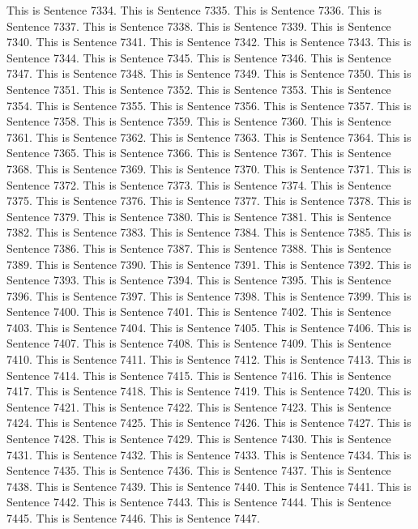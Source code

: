 \documentclass{article}
\begin{document}
This is Sentence 7334.
This is Sentence 7335.
This is Sentence 7336.
This is Sentence 7337.
This is Sentence 7338.
This is Sentence 7339.
This is Sentence 7340.
This is Sentence 7341.
This is Sentence 7342.
This is Sentence 7343.
This is Sentence 7344.
This is Sentence 7345.
This is Sentence 7346.
This is Sentence 7347.
This is Sentence 7348.
This is Sentence 7349.
This is Sentence 7350.
This is Sentence 7351.
This is Sentence 7352.
This is Sentence 7353.
This is Sentence 7354.
This is Sentence 7355.
This is Sentence 7356.
This is Sentence 7357.
This is Sentence 7358.
This is Sentence 7359.
This is Sentence 7360.
This is Sentence 7361.
This is Sentence 7362.
This is Sentence 7363.
This is Sentence 7364.
This is Sentence 7365.
This is Sentence 7366.
This is Sentence 7367.
This is Sentence 7368.
This is Sentence 7369.
This is Sentence 7370.
This is Sentence 7371.
This is Sentence 7372.
This is Sentence 7373.
This is Sentence 7374.
This is Sentence 7375.
This is Sentence 7376.
This is Sentence 7377.
This is Sentence 7378.
This is Sentence 7379.
This is Sentence 7380.
This is Sentence 7381.
This is Sentence 7382.
This is Sentence 7383.
This is Sentence 7384.
This is Sentence 7385.
This is Sentence 7386.
This is Sentence 7387.
This is Sentence 7388.
This is Sentence 7389.
This is Sentence 7390.
This is Sentence 7391.
This is Sentence 7392.
This is Sentence 7393.
This is Sentence 7394.
This is Sentence 7395.
This is Sentence 7396.
This is Sentence 7397.
This is Sentence 7398.
This is Sentence 7399.
This is Sentence 7400.
This is Sentence 7401.
This is Sentence 7402.
This is Sentence 7403.
This is Sentence 7404.
This is Sentence 7405.
This is Sentence 7406.
This is Sentence 7407.
This is Sentence 7408.
This is Sentence 7409.
This is Sentence 7410.
This is Sentence 7411.
This is Sentence 7412.
This is Sentence 7413.
This is Sentence 7414.
This is Sentence 7415.
This is Sentence 7416.
This is Sentence 7417.
This is Sentence 7418.
This is Sentence 7419.
This is Sentence 7420.
This is Sentence 7421.
This is Sentence 7422.
This is Sentence 7423.
This is Sentence 7424.
This is Sentence 7425.
This is Sentence 7426.
This is Sentence 7427.
This is Sentence 7428.
This is Sentence 7429.
This is Sentence 7430.
This is Sentence 7431.
This is Sentence 7432.
This is Sentence 7433.
This is Sentence 7434.
This is Sentence 7435.
This is Sentence 7436.
This is Sentence 7437.
This is Sentence 7438.
This is Sentence 7439.
This is Sentence 7440.
This is Sentence 7441.
This is Sentence 7442.
This is Sentence 7443.
This is Sentence 7444.
This is Sentence 7445.
This is Sentence 7446.
This is Sentence 7447.
\end{document}
